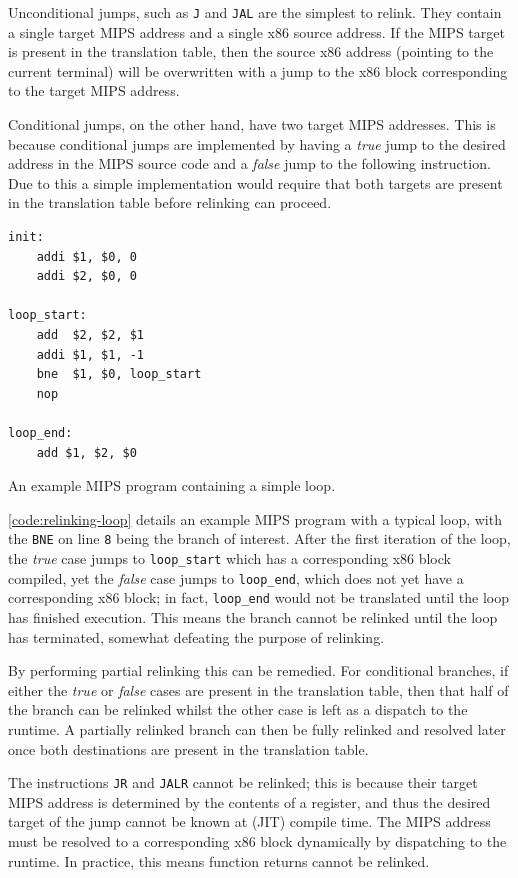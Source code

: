 Unconditional jumps, such as \texttt{J} and \texttt{JAL} are the simplest to relink. They contain a single target MIPS address and a single x86 source address. If the MIPS target is present in the translation table, then the source x86 address (pointing to the current terminal) will be overwritten with a jump to the x86 block corresponding to the target MIPS address.

Conditional jumps, on the other hand, have two target MIPS addresses. This is because conditional jumps are implemented by having a \textit{true} jump to the desired address in the MIPS source code and a \textit{false} jump to the following instruction. Due to this a simple implementation would require that both targets are present in the translation table before relinking can proceed.

\begin{lstfloat}[h]
    \begin{lstlisting}
init:
    addi $1, $0, 0
    addi $2, $0, 0

loop_start:
    add  $2, $2, $1
    addi $1, $1, -1
    bne  $1, $0, loop_start
    nop

loop_end:
    add $1, $2, $0

    \end{lstlisting}
    \caption{An example MIPS program containing a simple loop.}
    \label{code:relinking-loop}
\end{lstfloat}

\autoref{code:relinking-loop} details an example MIPS program with a typical loop, with the \texttt{BNE} on line \texttt{8} being the branch of interest. After the first iteration of the loop, the \textit{true} case jumps to \texttt{loop\_start} which has a corresponding x86 block compiled, yet the \textit{false} case jumps to \texttt{loop\_end}, which does not yet have a corresponding x86 block; in fact, \texttt{loop\_end} would not be translated until the loop has finished execution. This means the branch cannot be relinked until the loop has terminated, somewhat defeating the purpose of relinking.

By performing partial relinking this can be remedied. For conditional branches, if either the \textit{true} or \textit{false} cases are present in the translation table, then that half of the branch can be relinked whilst the other case is left as a dispatch to the runtime. A partially relinked branch can then be fully relinked and resolved later once both destinations are present in the translation table.

The instructions \texttt{JR} and \texttt{JALR} cannot be relinked; this is because their target MIPS address is determined by the contents of a register, and thus the desired target of the jump cannot be known at (JIT) compile time. The MIPS address must be resolved to a corresponding x86 block dynamically by dispatching to the runtime. In practice, this means function returns cannot be relinked.